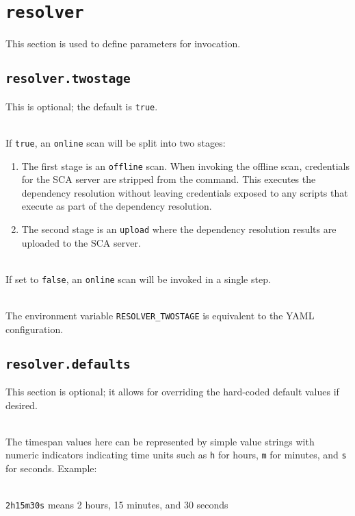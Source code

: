 \section{\texttt{resolver}}

This section is used to define parameters for \scaresolver invocation.

\subsection{\texttt{resolver.twostage}}

This is optional; the default is \texttt{true}.

\noindent\\If \texttt{true}, an \texttt{online} \scaresolver scan will be split into two stages:\\

\begin{enumerate}
    \item The first stage is an \texttt{offline} scan.  When invoking the offline scan, 
    credentials for the SCA server are stripped from the command.  This executes the dependency
    resolution without leaving credentials exposed to any scripts that execute as part of the 
    dependency resolution.
    \item The second stage is an \texttt{upload} where the dependency resolution results are
    uploaded to the SCA server.
\end{enumerate}

\noindent\\If set to \texttt{false}, an \texttt{online} scan will be invoked in a single step.

\noindent\\The environment variable \texttt{RESOLVER\_TWOSTAGE} is equivalent to the YAML configuration.


\subsection{\texttt{resolver.defaults}}

This section is optional; it allows for overriding the hard-coded default values if desired.

\noindent\\The timespan values here can be represented by simple value strings with numeric 
indicators indicating time units such as \texttt{h} for hours, \texttt{m} for 
minutes, and \texttt{s} for seconds.  Example:

\noindent\\\texttt{2h15m30s} means 2 hours, 15 minutes, and 30 seconds

